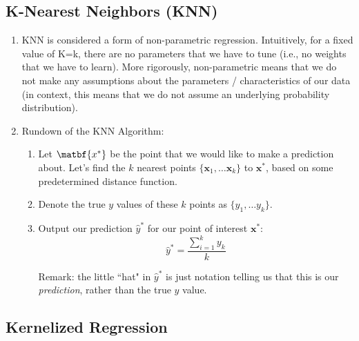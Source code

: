 \documentclass[11pt,letterpaper]{article}
\begin{document}
\subsection{K-Nearest Neighbors (KNN)}
\begin{enumerate}
    \item KNN is considered a form of non-parametric regression. Intuitively, for a fixed value of K=k, there are no parameters that we have to tune (i.e., no weights that we have to learn). More rigorously, non-parametric means that we do not make any assumptions about the parameters / characteristics of our data (in context, this means that we do not assume an underlying probability distribution).
    \item Rundown of the KNN Algorithm:
    \begin{enumerate}
        \item Let $\matbf{x^*}$ be the point that we would like to make a prediction about. Let's find the $k$ nearest points $\{\mathbf{x}_1, \dots \mathbf{x}_k\}$ to $\mathbf{x^*}$, based on some predetermined distance function.
        \item Denote the true $y$ values of these $k$ points as $\{y_1, \dots y_k \}$.
        \item Output our prediction $\hat{y}^*$ for our point of interest $\mathbf{x^{*}}$:
        $$\hat{y}^* = \frac{\displaystyle\sum_{i=1}^{k}y_{k}}{k}$$
        
        Remark: the little ``hat" in $\hat{y}^*$ is just notation telling us that this is our \emph{prediction}, rather than the true $y$ value.
    \end{enumerate}
\end{enumerate}

\subsection{Kernelized Regression}
\end{document}
